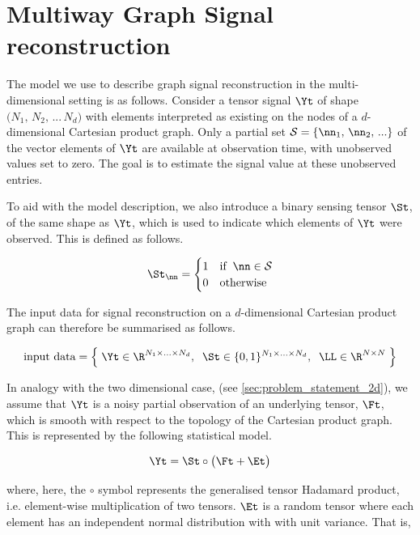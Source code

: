 \section{Multiway Graph Signal reconstruction}

\label{sec:tensor_gsr}

The model we use to describe graph signal reconstruction in the multi-dimensional setting is as follows. Consider a tensor signal $\Yt$ of shape $\big(N_1, \, N_2, \, ... \, N_d \big)$ with elements interpreted as existing on the nodes of a $d$-dimensional Cartesian product graph. Only a partial set $\mathcal{S} = \{\nn_1, \, \nn_2, \, ... \}$ of the vector elements of $\Yt$ are available at observation time, with unobserved values set to zero. The goal is to estimate the signal value at these unobserved entries. 

To aid with the model description, we also introduce a binary sensing tensor $\St$, of the same shape as $\Yt$, which is used to indicate which elements of $\Yt$ were observed. This is defined as follows.  

\begin{equation}
    \St_{\nn} = \begin{cases}
        1 & \text{if} \;\; \nn \in \mathcal{S} \\
        0 & \text{otherwise}
    \end{cases}
\end{equation}

The input data for signal reconstruction on a $d$-dimensional Cartesian product graph can therefore be summarised as follows. 

\begin{equation*}
    \text{input data} = \Big\{\; \Yt \in \R^{N_1 \times ... \times N_d}, \;\; \St \in \{0, 1\}^{N_1 \times ... \times N_d} , \;\; \LL \in \R^{N \times N} \; \Big\}
\end{equation*}

In analogy with the two dimensional case, (see \cref{sec:problem_statement_2d}), we assume that $\Yt$ is a noisy partial observation of an underlying tensor, $\Ft$, which is smooth with respect to the topology of the Cartesian product graph. This is represented by the following statistical model. 

\begin{equation}
    \Yt = \St \circ \big(\Ft + \Et \big)
\end{equation}

where, here, the $\circ$ symbol represents the generalised tensor Hadamard product, i.e. element-wise multiplication of two tensors. $\Et$ is a random tensor where each element has an independent normal distribution with with unit variance. That is,

